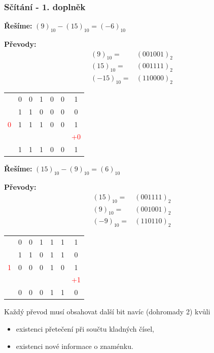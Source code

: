 	\begin{frame}
    \frametitle{Sčítání - 1. doplněk}
    \small
    \boldmath
		\begin{minipage}[t][0.65\textheight][t]{0.49\textwidth}
      \textbf{Řešíme:} $(9)_{10} - (15)_{10} = (-6)_{10}$
      
      \textbf{Převody:} 
      \begin{align*}
      (9)_{10} =& (001001)_2 \\
      (15)_{10} =& (001111)_2 \\
      (-15)_{10} =& (110000)_2
      \end{align*}
      \vspace{5mm}
      \centering
			\begin{tabular}{ c | c c c c c c}
				   & 0 & 0 & 1 & 0 & 0 & 1 \\
				   & 1 & 1 & 0 & 0 & 0 & 0 \\
        \hline
          \textcolor{red}{0} & 1 & 1 & 1 & 0 & 0 & 1 \\
           &  &  &  &  &  & \textcolor{red}{+0} \\
         \hline
           & 1 & 1 & 1 & 0 & 0 & 1 \\
			\end{tabular}
      
		\end{minipage}
		\begin{minipage}[t][0.65\textheight][t]{0.5\textwidth}
      \textbf{Řešíme:} $(15)_{10} - (9)_{10} = (6)_{10}$ 
      
      \textbf{Převody:} 
      \begin{align*}
      (15)_{10} =& (001111)_2 \\
      (9)_{10} =& (001001)_2 \\
      (-9)_{10} =& (110110)_2
      \end{align*}
      \vspace{5mm}
      \centering
			\begin{tabular}{ c | c c c c c c}
				   & 0 & 0 & 1 & 1 & 1 & 1 \\
				   & 1 & 1 & 0 & 1 & 1 & 0 \\
        \hline
          \textcolor{red}{1} & 0 & 0 & 0 & 1 & 0 & 1 \\
           &  &  &  &  &  & \textcolor{red}{+1} \\
         \hline
           & 0 & 0 & 0 & 1 & 1 & 0 \\
			\end{tabular}
      
		\end{minipage}
		
    Každý převod musí obsahovat další bit navíc (dohromady 2) kvůli
    \begin{itemize}
      \item existenci přetečení při součtu kladných čísel,
      \item existenci nové informace o znaménku.
    \end{itemize}
    
	\end{frame}
  
